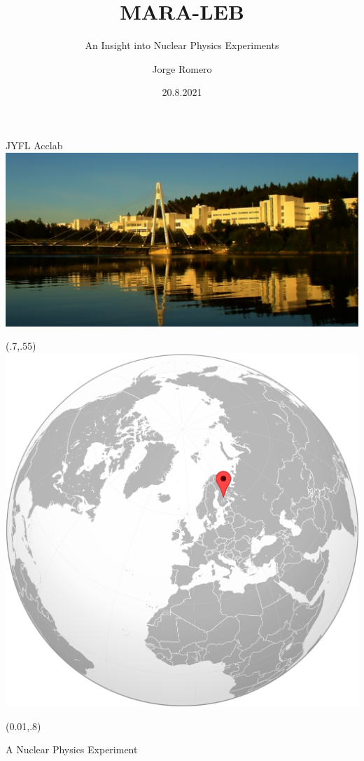 \documentclass{beamer}
\title{MARA-LEB}
\subtitle{An Insight into Nuclear Physics Experiments}
\date{20.8.2021}
\author[auth]{Jorge Romero}
\institute[inst]{University of Liverpool, Jyväskylän Yliopisto}
\begin{document}
\begin{frame}
\titlepage
\end{frame}

\begin{frame}{JYFL Acclab}
    \centering
    \vspace*{4em}
    \hspace*{-3em}
    \includegraphics[scale=0.6]{assets/JYFL}
    \vfill
    \begin{textblock*}{0.3\paperwidth}(.7\paperwidth,.55\paperheight)
        \includegraphics[scale=0.06]{assets/JYFL_locator}
    \end{textblock*}
    \begin{textblock*}{0.7\paperwidth}(0.01\paperwidth,.8\paperheight)
        \color{white}{The northernmost accelerator laboratory in the world!}
    \end{textblock*}
\end{frame}

\begin{frame}{A Nuclear Physics Experiment}
    
\end{frame}
\end{document}
